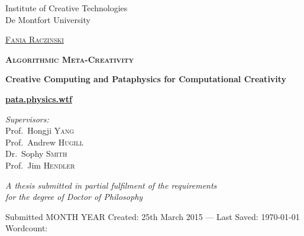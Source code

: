 
\begin{titlingpage}
\begin{center}

Institute of Creative Technologies\\
De Montfort University

\vspace{1cm}

\textsc{\huge \href{http://fania.uk}{Fania Raczinski}}

\vspace{1.5cm}


\textsc{\bfseries\scshape\sffamily \fontsize{40}{30}\selectfont Algorithmic Meta-Creativity}

\vspace{1cm}

{\huge \bfseries Creative Computing and Pataphysics for Computational Creativity}

\vspace{1cm}
{\Huge \textbf{\url{pata.physics.wtf}}}
\vspace{1.5cm}

\emph{Supervisors:}\\
{Prof.\ Hongji \textsc{Yang}}\\
{Prof.\ Andrew \textsc{Hugill}}\\
{Dr.\ Sophy \textsc{Smith}}\\
{Prof.\ Jim \textsc{Hendler}}

\vspace{1.5cm}

\large \emph{A thesis submitted in partial fulfilment of the requirements\\ for the degree of Doctor of Philosophy}

\vfill
Submitted MONTH YEAR
Created: {25th March 2015} --- Last Saved: {\today}\\
Wordcount: \wordcount

\end{center}
\end{titlingpage}
